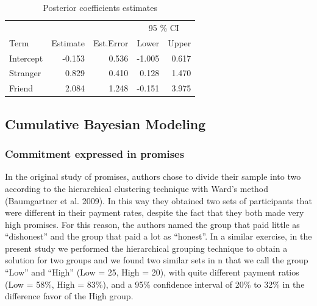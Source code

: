 \documentclass[smallextended]{svjour3}       %
\begin{document}
\begin{table}[t]

\caption{\label{tab:tabla}Posterior coefficients estimates}
\begin{tabular}{lrrrr}
\toprule
\multicolumn{1}{c}{ } & \multicolumn{2}{c}{ } & \multicolumn{2}{c}{95 \% CI} \\
\cmidrule(l{3pt}r{3pt}){4-5}
Term & Estimate & Est.Error & Lower & Upper\\
\midrule
Intercept & -0.153 & 0.536 & -1.005 & 0.617\\
Stranger & 0.829 & 0.410 & 0.128 & 1.470\\
Friend & 2.084 & 1.248 & -0.151 & 3.975\\
\bottomrule
\end{tabular}
\end{table}

\hypertarget{cumulative-bayesian-modeling}{%
\subsection{Cumulative Bayesian
Modeling}\label{cumulative-bayesian-modeling}}

\hypertarget{commitment-expressed-in-promises}{%
\subsubsection{Commitment expressed in
promises}\label{commitment-expressed-in-promises}}

In the original study of promises, authors chose to divide their sample
into two according to the hierarchical clustering technique with Ward's
method (Baumgartner et al. 2009). In this way they obtained two sets of
participants that were different in their payment rates, despite the
fact that they both made very high promises. For this reason, the
authors named the group that paid little as ``dishonest'' and the group
that paid a lot as ``honest''. In a similar exercise, in the present
study we performed the hierarchical grouping technique to obtain a
solution for two groups and we found two similar sets in n that we call
the group ``Low'' and ``High'' (Low = 25, High = 20), with quite
different payment ratios (Low = 58\%, High = 83\%), and a 95\%
confidence interval of 20\% to 32\% in the difference favor of the High
group.
\end{document}

